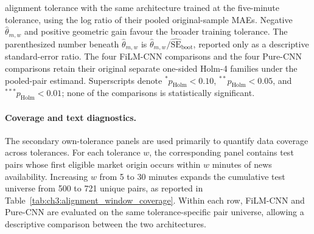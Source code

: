 \begin{table}[htbp]
{alignment tolerance with the same architecture trained at the five-minute
tolerance, using the log ratio of their pooled original-sample MAEs. Negative
$\widehat{\theta}_{m,w}$ and positive geometric gain
favour the broader training tolerance. The parenthesized number beneath
$\widehat{\theta}_{m,w}$ is
$\widehat{\theta}_{m,w}/\widehat{\mathrm{SE}}_{\mathrm{boot}}$, reported only
as a descriptive standard-error ratio.
The four FiLM-CNN comparisons and the four Pure-CNN comparisons retain their
original separate one-sided Holm-4 families under the pooled-pair estimand.
Superscripts denote
$^{*}p_{\mathrm{Holm}}<0.10$,
$^{**}p_{\mathrm{Holm}}<0.05$, and
$^{***}p_{\mathrm{Holm}}<0.01$; none of the comparisons is statistically
significant.}
\label{tab:ch3:alignment_window_within_model}
\end{table}



\paragraph*{Coverage and text diagnostics.}
The secondary own-tolerance panels are used primarily to quantify data
coverage across tolerances. For
each tolerance $w$, the corresponding panel contains test pairs whose first
eligible market origin occurs within $w$ minutes of news availability.
Increasing $w$ from 5 to 30 minutes expands the cumulative test universe from
500 to 721 unique pairs, as reported in
Table~\ref{tab:ch3:alignment_window_coverage}. Within each row, FiLM-CNN and
Pure-CNN are evaluated on the same tolerance-specific pair universe, allowing
a descriptive comparison between the two architectures.


